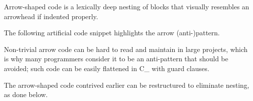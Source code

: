 Arrow-shaped code is a lexically deep nesting of blocks
that visually resembles an arrowhead if indented properly.

\example
The following artificial code snippet highlights the arrow (anti-)pattern.


Non-trivial arrow code can be hard to read and maintain in large projects,
which is why many programmers consider it to be an anti-pattern that should be
avoided; such code can be easily flattened in C\_ with guard clauses.

\example The arrow-shaped code contrived earlier can
be restructured to eliminate nesting, as done below.

